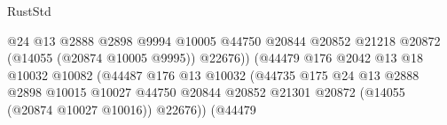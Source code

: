 \begin{lexlean}{RustStd}
\begin{coremodule}
                                                          @24
                                                          @13
                                                          @2888
                                                          @2898
                                                          @9994
                                                          @10005
                                                          @44750
                                                          @20844
                                                          @20852
                                                          @21218
                                                          @20872
                                                          (@14055 (@20874 @10005 @9995))
                                                          @22676))
                                                      (@44479
                                                        @176
                                                        @2042
                                                        @13
                                                        @18
                                                        @10032
                                                        @10082
                                                        (@44487
                                                          @176
                                                          @13
                                                          @10032
                                                          (@44735
                                                            @175
                                                            @24
                                                            @13
                                                            @2888
                                                            @2898
                                                            @10015
                                                            @10027
                                                            @44750
                                                            @20844
                                                            @20852
                                                            @21301
                                                            @20872
                                                            (@14055 (@20874 @10027 @10016))
                                                            @22676))
                                                        (@44479

\end{coremodule}
\end{lexlean}
